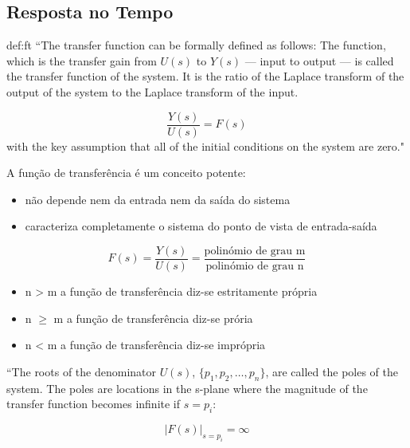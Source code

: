 \subsection[2.1 Resposta no Tempo]{\hspace*{0.075 em}\raisebox{0.2 em}{$\pmb{\drsh}$} Resposta no Tempo}
\label{sec:resposta-no-tempo}

\begin{theo}{def:ft}\label{def:ft}
    \noindent ``The transfer function can be formally defined as follows: The function, which is the transfer gain from $U(s)$ to $Y(s)$ --- input to output --- is called the transfer
    function of the system. It is the ratio of the Laplace transform of the output of the
    system to the Laplace transform of the input.

    $$
        \dfrac{Y(s)}{U(s)} = F(s)
    $$
    \noindent with the key assumption that all of the initial conditions on the system are zero."\cite{FranklinPowell2015}
\end{theo}

\noindent A função de transferência é um conceito potente:

\begin{itemize}
    \item não depende nem da entrada nem da saída do sistema
    \item caracteriza completamente o sistema do ponto de vista de entrada-saída
\end{itemize}

$$
     F(s) = \dfrac{Y(s)}{U(s)} = \dfrac{\text{polinómio de grau m}}{\text{polinómio de grau n}}
$$

\begin{itemize}
    \item n > m a função de transferência diz-se estritamente própria
    \item n $\ge$ m a função de transferência diz-se prória
    \item n < m a função de transferência diz-se imprópria
\end{itemize}

\noindent ``The roots of the denominator $U(s)$, $\{p_1,p_2,\dots,p_n\}$, are called the poles of the system.
The poles are locations in the s-plane where the magnitude of the transfer function becomes infinite if $s = p_i$:

$$
    \boxed{|F(s)|_{s = p_i} = \infty}
$$

